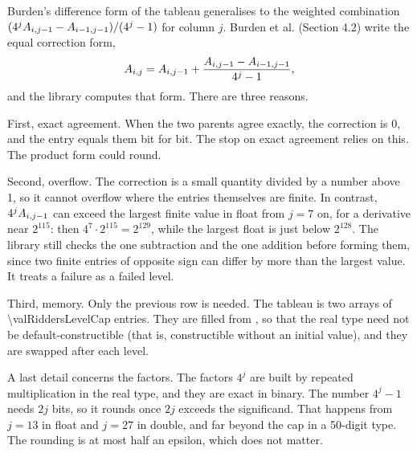 \begin{sidebar}[label=sb:difference-form]{Burden's difference form of the tableau}
 generalises to the weighted combination
$(4^j A_{i,j-1} - A_{i-1,j-1}) / (4^j - 1)$ for column $j$. Burden et al.\cite{burden2016} (Section 4.2) write
the equal correction form,
\[
  A_{i,j} = A_{i,j-1} + \frac{A_{i,j-1} - A_{i-1,j-1}}{4^j - 1},
\]
and the library computes that form. There are three reasons.

First, exact agreement. When the two parents agree exactly, the correction is 0, and the entry equals them bit for
bit. The stop on exact agreement relies on this. The product form could round.

Second, overflow. The correction is a small quantity divided by a number above 1, so it cannot overflow where the
entries themselves are finite. In contrast, $4^j A_{i,j-1}$ can exceed the largest finite value in float from
$j = 7$ on, for a derivative near $2^{115}$: then $4^7 \cdot 2^{115} = 2^{129}$, while the largest float is just
below $2^{128}$. The library still checks the one subtraction and the one addition before forming them, since two
finite entries of opposite sign can differ by more than the largest value. It treats a failure as a failed level.

Third, memory. Only the previous row is needed. The tableau is two arrays of \num{\valRiddersLevelCap} entries. They
are filled from , so that the real type need not be default-constructible (that is, constructible without
an initial value), and they are swapped after each level.

A last detail concerns the factors. The factors $4^j$ are built by repeated multiplication in the real type, and
they are exact in binary. The number $4^j - 1$ needs $2j$ bits, so it rounds once $2j$ exceeds the
significand. That happens from $j = 13$ in float and $j = 27$ in double, and far beyond the cap in a 50-digit type.
The rounding is at most half an epsilon, which does not matter.
\end{sidebar}

